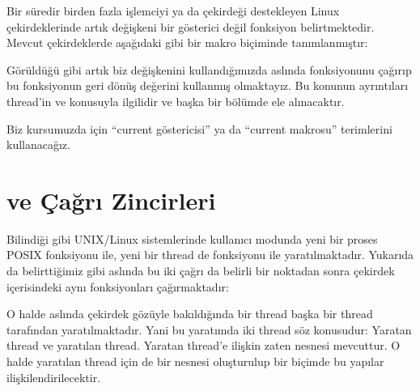 \documentclass[a4paper,10pt,turkish]{sphinxmanual}
\begin{document}
\sphinxAtStartPar
Bir süredir birden fazla işlemciyi ya da çekirdeği destekleyen Linux çekirdeklerinde artık 
değişkeni bir gösterici değil fonksiyon belirtmektedir. Mevcut çekirdeklerde  aşağıdaki gibi bir
makro biçiminde tanımlanmıştır:

\begin{sphinxVerbatim}[commandchars=\\\{\}]
\end{sphinxVerbatim}

\sphinxAtStartPar
Görüldüğü gibi artık biz  değişkenini kullandığımızda aslında  fonksiyonunu
çağırıp bu fonksiyonun geri dönüş değerini kullanmış olmaktayız. Bu konunun ayrıntıları thread’in
 ve  konusuyla ilgilidir ve başka
bir bölümde ele alınacaktır.

\sphinxAtStartPar
Biz kursumuzda  için “current göstericisi” ya da “current makrosu” terimlerini kullanacağız.


\section{ ve  Çağrı Zincirleri}
\label{\detokenize{processcontrolblock:fork-ve-pthread-create-cagri-zincirleri}}
\sphinxAtStartPar
Bilindiği gibi UNIX/Linux sistemlerinde kullanıcı modunda yeni bir proses  POSIX fonksiyonu ile,
yeni bir thread de  fonksiyonu ile yaratılmaktadır. Yukarıda da belirttiğimiz gibi
aslında bu iki çağrı da belirli bir noktadan sonra çekirdek içerisindeki aynı fonksiyonları
çağırmaktadır:


\sphinxAtStartPar
O halde aslında çekirdek gözüyle bakıldığında bir thread başka bir thread tarafından yaratılmaktadır.
Yani bu yaratımda iki thread söz konusudur: Yaratan thread ve yaratılan thread. Yaratan thread’e ilişkin
zaten  nesnesi mevcuttur. O halde yaratılan thread için de bir  nesnesi
oluşturulup bir biçimde bu yapılar ilişkilendirilecektir.
\end{document}
